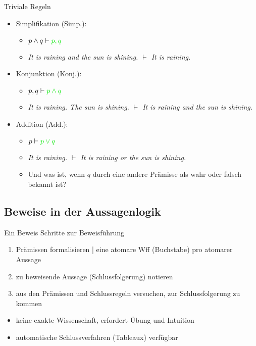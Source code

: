 \begin{frame}
  {Triviale Regeln}
  \begin{itemize}[<+->]
    \item \alert{Simplifikation (Simp.)}:
      \begin{itemize}
        \item \alert{$p\wedge q\vdash\gruen{p, q}$}
        \item \emph{It is raining and the sun is shining. $\vdash$ It is raining.}
      \end{itemize}
      \Halbzeile
    \item \alert{Konjunktion (Konj.)}:
      \begin{itemize}
        \item \alert{$p, q\vdash\gruen{p\wedge q}$}
        \item \emph{It is raining. The sun is shining. $\vdash$ It is raining and the sun is shining.}
      \end{itemize}
      \Halbzeile
    \item \alert{Addition (Add.)}:
      \begin{itemize}
        \item \alert{$p\vdash\gruen{p\vee q}$}
        \item \emph{It is raining. $\vdash$ It is raining or the sun is shining.}
        \item Und was ist, wenn $q$ durch eine andere Prämisse als wahr oder falsch bekannt ist?
      \end{itemize}
  \end{itemize}
\end{frame}

\subsection{Beweise in der Aussagenlogik}

\begin{frame}
  {Ein Beweis}
  \onslide<+->
  \onslide<+->
  Schritte zur Beweisführung\\
  \Halbzeile
  \begin{enumerate}[<+->]
    \item Prämissen formalisieren | eine atomare Wff (Buchstabe) pro atomarer Aussage
    \item zu beweisende Aussage (Schlussfolgerung) notieren
    \item aus den Prämissen und Schlussregeln versuchen, zur Schlussfolgerung zu kommen
  \end{enumerate}
  \Halbzeile
  \begin{itemize}[<+->]
    \item keine exakte Wissenschaft, erfordert Übung und Intuition
    \item automatische Schlussverfahren (Tableaux) verfügbar \citep{ParteeEa1990}
  \end{itemize}
\end{frame}

